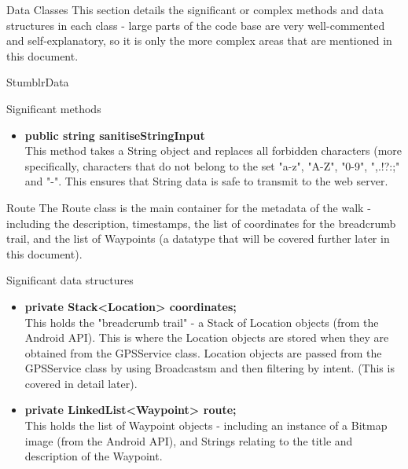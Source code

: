 \documentclass{article}
\begin{document}
	\newpage
	\begin{section}{Data Classes}
		This section details the significant or complex methods and data structures in each class - large parts of the code base are very well-commented and self-explanatory, so it is only the more complex areas that are mentioned in this document.
		\begin{subsection}{StumblrData}
			\begin{subsubsection}{Significant methods}
				\begin{itemize}				
					\item{{\bf public string sanitiseStringInput} \\
					This method takes a String object and replaces all forbidden characters (more specifically, characters that do not belong to the set "a-z", "A-Z", "0-9", ",.!?:;" and "-". This ensures that String data is safe to transmit to the web server.}
				\end{itemize}
			\end{subsubsection}
		\end{subsection}
	
		\begin{subsection}{Route}
			The Route class is the main container for the metadata of the walk - including the description, timestamps, the list of coordinates for the breadcrumb trail, and the list of Waypoints (a datatype that will be covered further later in this document). \\
			
			\begin{subsubsection}{Significant data structures}
				\begin{itemize}				
					\item{{\bf private Stack<Location> coordinates;} \\
					This holds the "breadcrumb trail" - a Stack of Location objects (from the Android API). This is where the Location objects are stored when they are obtained from the GPSService class. Location objects are passed from the GPSService class by using Broadcastsm and then filtering by intent. (This is covered in detail later).}
					\item{{\bf private LinkedList<Waypoint> route;} \\
					This holds the list of Waypoint objects - including an instance of a Bitmap image (from the Android API), and Strings relating to the title and description of the Waypoint.}
				\end{itemize}
			\end{subsubsection}
			

\end{subsection}
\end{section}
\end{document}

